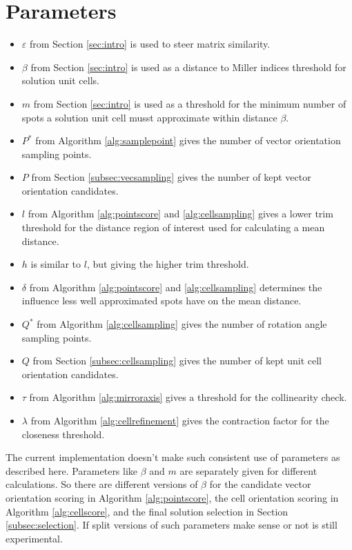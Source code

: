 \documentclass[a4paper,10pt]{article}
\begin{document}
\section{Parameters}

\begin{itemize}
 \item $\varepsilon$ from Section \ref{sec:intro} is used to steer matrix similarity.
 \item $\beta$ from Section \ref{sec:intro} is used as a distance to Miller indices threshold for solution unit cells.
 \item $m$ from Section \ref{sec:intro} is used as a threshold for the minimum number of spots a solution unit cell musst approximate within distance $\beta$.
 \item $P^*$ from Algorithm \ref{alg:samplepoint} gives the number of vector orientation sampling points.
 \item $P$ from Section \ref{subsec:vecsampling} gives the number of kept vector orientation candidates.
 \item $l$ from Algorithm \ref{alg:pointscore} and \ref{alg:cellsampling} gives a lower trim threshold for the distance region of interest used for calculating a mean distance.
 \item $h$ is similar to $l$, but giving the higher trim threshold.
 \item $\delta$ from Algorithm \ref{alg:pointscore} and \ref{alg:cellsampling} determines the influence less well approximated spots have on the mean distance.
 \item $Q^*$ from Algorithm \ref{alg:cellsampling} gives the number of rotation angle sampling points.
 \item $Q$ from Section \ref{subsec:cellsampling} gives the number of kept unit cell orientation candidates.
 \item $\tau$ from Algorithm \ref{alg:mirroraxis} gives a threshold for the collinearity check.
 \item $\lambda$ from Algorithm \ref{alg:cellrefinement} gives the contraction factor for the closeness threshold.
\end{itemize}

The current implementation doesn't make such consistent use of parameters as described here. Parameters like $\beta$ and $m$ are separately given for different calculations. So there are different versions of $\beta$ for the candidate vector orientation scoring in Algorithm \ref{alg:pointscore}, the cell orientation scoring in Algorithm \ref{alg:cellscore}, and the final solution selection in Section \ref{subsec:selection}. If split versions of such parameters make sense or not is still experimental.

\printbibliography
\end{document}
